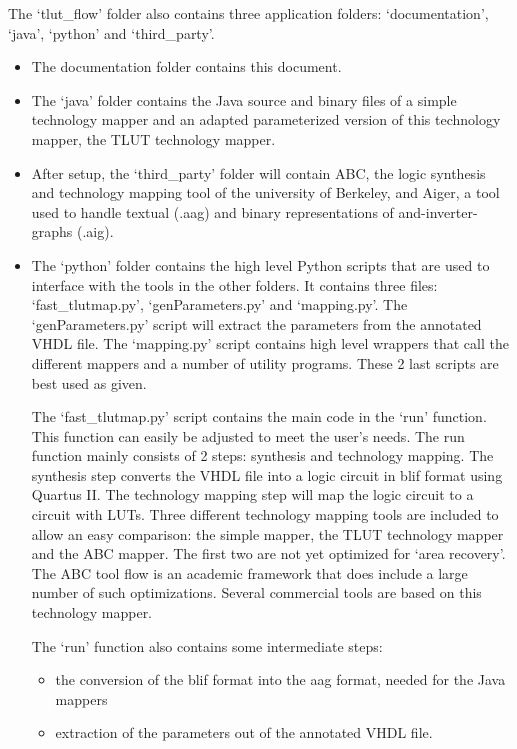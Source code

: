 \documentclass[a4paper,oneside]{memoir}
\begin{document}
The `tlut\_flow' folder also contains three application folders:  `documentation',  `java', `python' and `third\_party'.

\begin{itemize}
\item The documentation folder contains this document.
\item The `java' folder contains the Java source and binary files of a simple technology mapper and an adapted parameterized version of this technology mapper, the TLUT technology mapper.
\item After setup, the `third\_party' folder will contain ABC, the logic synthesis and technology mapping tool of the university of Berkeley, and Aiger, a tool used to handle textual (.aag) and binary representations of and-inverter-graphs (.aig).    

\item The `python' folder contains the high level Python scripts that are used to interface with the tools in the other folders. It contains three files: `fast\_tlutmap.py', `genParameters.py' and `mapping.py'. The `genParameters.py' script will extract the parameters from the annotated VHDL file. The `mapping.py' script contains high level wrappers that call the different mappers and a number of utility programs. These 2 last scripts are best used as given. 

The `fast\_tlutmap.py' script contains the main code in the `run' function. This function can easily be adjusted to meet the user's needs. The run function mainly consists of 2 steps: synthesis and technology mapping. The synthesis step converts the VHDL file into a logic circuit in blif format using Quartus II. The technology mapping step will map the logic circuit to a circuit with LUTs. Three different technology mapping tools are included to allow an easy comparison: the simple mapper, the TLUT technology mapper and the ABC mapper. The first two are not yet optimized for `area recovery'. The ABC tool flow is an academic framework that does include a large number of such optimizations. Several commercial tools are based on this technology mapper.

The `run' function also contains some intermediate steps:
\begin{itemize} 
\item the conversion of the blif format into the aag format, needed for the Java mappers
\item extraction of the parameters out of the annotated VHDL file.
\end{itemize}

\end{itemize}

\end{document}
